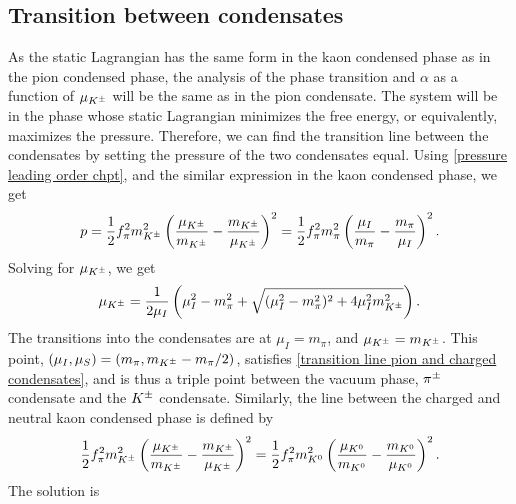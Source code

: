 \subsection{Transition between condensates}


As the static Lagrangian has the same form in the kaon condensed phase as in the pion condensed phase, the analysis of the phase transition and $\alpha$ as a function of $\mu_{K^\pm}$ will be the same as in the pion condensate.
The system will be in the phase whose static Lagrangian minimizes the free energy, or equivalently, maximizes the pressure.
Therefore, we can find the transition line between the condensates by setting the pressure of the two condensates equal.
Using \autoref{pressure leading order chpt}, and the similar expression in the kaon condensed phase, we get
%
\begin{equation}
    p 
    = \frac{1}{2} f_\pi^2 m_{K^\pm}^2 \left( \frac{\mu_{K^\pm}}{m_{K^\pm}} - \frac{m_{K^\pm}}{\mu_{K^\pm}} \right)^2
    =
    \frac{1}{2} f_\pi^2m_\pi^2  \left( \frac{\mu_I}{m_\pi} - \frac{m_\pi}{\mu_I} \right)^2.
\end{equation}
%
Solving for $\mu_{K^\pm}$, we get
%
\begin{equation}
    \label{transition line pion and charged condensates}
    \mu_{K^\pm} =\frac{1}{2\mu_I} \left(\mu_I^2 - m_\pi^2  + \sqrt{(\mu_I^2 - m_\pi^2)^2 + 4\mu_I^2 m_{K^\pm}^2}\right).
\end{equation}
%
The transitions into the condensates are at $\mu_I = m_\pi$, and $\mu_{K^\pm} = m_{K^\pm}$.
This point, $(\mu_I, \mu_S) = (m_\pi, m_{K^\pm} - m_\pi/2)$, satisfies \autoref{transition line pion and charged condensates}, and is thus a triple point between the vacuum phase, ${\pi^\pm}$ condensate and the ${K^\pm}$ condensate. 
Similarly, the line between the charged and neutral kaon condensed phase is defined by
%
\begin{equation}
    \frac{1}{2} f_\pi^2 m_{K^\pm}^2 \left( \frac{\mu_{K^\pm}}{m_{K^\pm}} - \frac{m_{K^\pm}}{\mu_{K^\pm}} \right)^2
    =
    \frac{1}{2} f_\pi^2 m_{K^0}^2 \left( \frac{\mu_{K^0}}{m_{K^0}} - \frac{m_{K^0}}{\mu_{K^0}} \right)^2.
\end{equation}
%
The solution is
